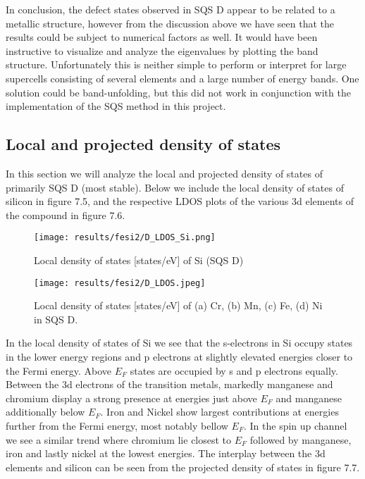 In conclusion, the defect states observed in SQS D appear to be related to a metallic structure, however from the discussion above we have seen that the results could be subject to numerical factors as well. It would have been instructive to visualize and analyze the eigenvalues by plotting the band structure. Unfortunately this is neither simple to perform or interpret for large supercells consisting of several elements and a large number of energy bands. One solution could be band-unfolding, but this did not work in conjunction with the implementation of the SQS method in this project. 

\subsection{Local and projected density of states}
In this section we will analyze the local and projected density of states of primarily SQS D (most stable). Below we include the local density of states of silicon in figure 7.5, and the respective LDOS plots of the various 3d elements of the compound in figure 7.6.  
  
\begin{figure}[H]
	\centering
	\texttt{[image: results/fesi2/D\_LDOS\_Si.png]}
	\caption{Local density of states [states/eV] of Si (SQS D)}
\end{figure} 

\begin{figure}[H]
	\centering
	\texttt{[image: results/fesi2/D\_LDOS.jpeg]}
	\caption{Local density of states [states/eV] of (a) Cr, (b) Mn, (c) Fe, (d) Ni in SQS D.}
\end{figure}   
  
In the local density of states of Si we see that the s-electrons in Si occupy states in the lower energy regions and p electrons at slightly elevated energies closer to the Fermi energy. Above $E_F$ states are occupied by s and p electrons equally. Between the 3d electrons of the transition metals, markedly manganese and chromium display a strong presence at energies just above $E_F$ and manganese additionally below $E_F$. Iron and Nickel show largest contributions at energies further from the Fermi energy, most notably bellow $E_F$. In the spin up channel we see a similar trend where chromium lie closest to $E_F$ followed by manganese, iron and lastly nickel at the lowest energies. The interplay between the 3d elements and silicon can be seen from the projected density of states in figure 7.7.


